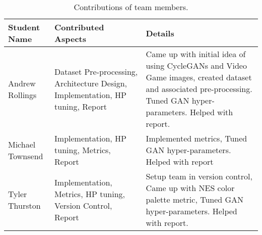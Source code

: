 \documentclass[10pt,twocolumn,letterpaper]{article}
\begin{document}
\begin{table*}
   \begin{center}
      \begin{tabular}{|p{3cm}|p{5.5cm}|p{8.5cm}|}
         \hline
         Student Name     & Contributed Aspects                                                            & Details                                                                                                                                                            \\
         \hline\hline
         Andrew Rollings  & Dataset Pre-processing, Architecture Design, Implementation, HP tuning, Report & Came up with initial idea of using CycleGANs and Video Game images, created dataset and associated pre-processing. Tuned GAN hyper-parameters. Helped with report. \\
         \hline
         Michael Townsend & Implementation, HP tuning, Metrics, Report                                     & Implemented metrics, Tuned GAN hyper-parameters. Helped with report                                                                                                \\
         \hline
         Tyler Thurston   & Implementation, Metrics, HP tuning, Version Control, Report                    & Setup team in version control, Came up with NES color palette metric, Tuned GAN hyper-parameters. Helped with report.                                              \\
         \hline
      \end{tabular}
   \end{center}
   \caption{Contributions of team members.}
   \label{tab:contributions}
\end{table*}




{\small


}
\end{document}
